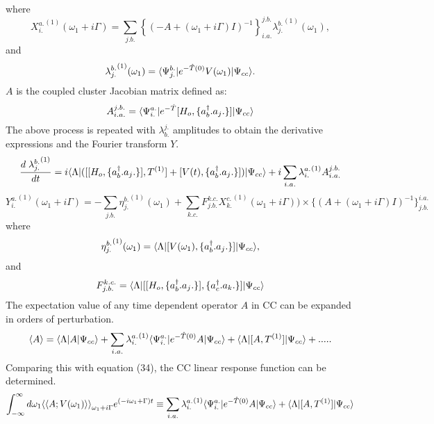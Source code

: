 where
\begin{equation}
{X^{a.}_{i.}}^{(1)}(\omega_1 + i\Gamma)  = \sum_{j.b.}{\left\{{(-A + (\omega_1 + i \Gamma) I )}^{-1}\right\}}^{j.b.}_{i.a.}{\lambda^{b.}_{j.}}^{(1)}(\omega_1),
\end{equation}
and  
\begin{equation}
{\lambda^{b.}_{j.}}^{(1)}(\omega_1) = \langle \Psi^{b.}_{j.} |e^{-\hat{T}(0)}V(\omega_1)| \Psi_{cc} \rangle.
\end{equation}
$A$ is the coupled cluster Jacobian matrix defined as:
\begin{equation}
A^{j.b.}_{i.a.} = \langle \Psi^{a.}_{i.} |e^{-\hat{T}}\lbrack H_o,\{{a}^\dagger_b.a_j.\}\rbrack| \Psi_{cc} \rangle
\end{equation}
The above process is repeated with $\lambda^{j.}_{b.}$ amplitudes to obtain the derivative expressions and the Fourier transform $Y$.
\begin{equation}
\frac{d\;{\lambda^{b.}_{j.}}^{(1)}}{dt} = i\langle \Lambda |(\lbrack\lbrack H_o,\{{a}^\dagger_b.a_j.\}\rbrack,T^{(1)}\rbrack + \lbrack V(t),\{{a}^\dagger_b.a_j.\}\rbrack)| \Psi_{cc} \rangle + i\sum_{i.a.} {\lambda^{a.}_{i.}}^{(1)}A^{j.b.}_{i.a.} 
\end{equation}
\begin{equation} 
{Y^{a.}_{i.}}^{(1)}(\omega_1 + i\Gamma) = - \sum_{j.b.}{\eta^{b.}_{j.}}^{(1)}(\omega_1) + \sum_{k.c.}F^{k.c.}_{j.b.} {X^{c.}_{k.}}^{(1)}(\omega_1 + i\Gamma)) \times\{{(A + (\omega_1 + i\Gamma)I)}^{-1}\}^{i.a.}_{j.b.}
\end{equation}
where
\begin{equation}
{\eta^{b.}_{j.}}^{(1)}(\omega_1) = \langle \Lambda |\lbrack V(\omega_1),\{{a}^\dagger_b.a_j.\}\rbrack| \Psi_{cc} \rangle ,
\end{equation}
and 
\begin{equation}
F^{k.c.}_{j.b.} = \langle \Lambda |\lbrack\lbrack H_o,\{{a}^\dagger_b.a_j.\}\rbrack,\{{a}^\dagger_c.a_k.\}\rbrack| \Psi_{cc} \rangle  
\end{equation}
The expectation value of any time dependent operator $A$ in CC can be expanded in orders of perturbation.
\begin{equation}
\langle A \rangle = \langle \Lambda |A| \Psi_{cc} \rangle + \sum_{i.a.}{\lambda^{a.}_{i.}}^{(1)}\langle \Psi^{a.}_{i.} |e^{-\hat{T}(0)}A| \Psi_{cc} \rangle + \langle \Lambda |\lbrack A,T^{(1)}\rbrack| \Psi_{cc} \rangle + .....
\end{equation}
Comparing this with equation (34), the CC linear response function can be determined.
\begin{equation}
\int_{-\infty}^{\infty}d\omega_1{\langle\langle A;V(\omega_1)\rangle\rangle}_{\omega_1 + i \Gamma}e^{(-i\omega_1 + \Gamma)t} \equiv \sum_{i.a.}{\lambda^{a.}_{i.}}^{(1)}\langle \Psi^{a.}_{i.} |e^{-\hat{T}(0)}A| \Psi_{cc} \rangle + \langle \Lambda |\lbrack A,T^{(1)}\rbrack| \Psi_{cc} \rangle
\end{equation}

